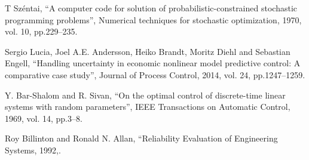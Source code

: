 \documentclass[conference]{IEEEtran}
\begin{document}
\begin{thebibliography}{00}
 T Sz\'entai, ``A computer code for solution of probabilistic-constrained stochastic programming problems'', Numerical techniques for stochastic optimization, 1970,  vol. 10, pp.229--235.

 Sergio Lucia, Joel A.E. Andersson, Heiko Brandt, Moritz Diehl and Sebastian Engell, ``Handling uncertainty in economic nonlinear model predictive control: A comparative case study'', Journal of Process Control, 2014, vol. 24, pp.1247--1259.

 Y. {Bar-Shalom} and R. {Sivan}, ``On the optimal control of discrete-time linear systems with random parameters'', IEEE Transactions on Automatic Control, 1969, vol. 14, pp.3--8.

 Roy Billinton and Ronald N. Allan, ``Reliability Evaluation of Engineering Systems, 1992,.

\end{thebibliography}
\end{document}
